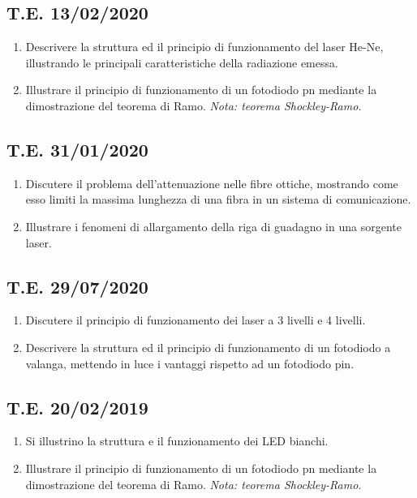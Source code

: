 \documentclass[9pt]{extarticle}
\begin{document}
\subsection{T.E. 13/02/2020}
\begin{enumerate}
  \item Descrivere la struttura ed il principio di funzionamento del laser He-Ne, illustrando le principali caratteristiche della radiazione emessa.
  \item Illustrare il principio di funzionamento di un fotodiodo pn mediante la dimostrazione del teorema di Ramo. \textit{Nota: teorema Shockley-Ramo.}
\end{enumerate}

\subsection{T.E. 31/01/2020}
\begin{enumerate}
  \item Discutere il problema dell'attenuazione nelle fibre ottiche, mostrando come esso limiti la massima lunghezza di
        una fibra in un sistema di comunicazione.
  \item Illustrare i fenomeni di allargamento della riga di guadagno in una sorgente laser.
\end{enumerate}

\subsection{T.E. 29/07/2020}
\begin{enumerate}
  \item Discutere il principio di funzionamento dei laser a 3 livelli e 4 livelli.
  \item Descrivere la struttura ed il principio di funzionamento di un fotodiodo a valanga, mettendo in luce i vantaggi
        rispetto ad un fotodiodo pin.
\end{enumerate}

\subsection{T.E. 20/02/2019}
\begin{enumerate}
  \item Si illustrino la struttura e il funzionamento dei LED bianchi.
  \item Illustrare il principio di funzionamento di un fotodiodo pn mediante la dimostrazione del teorema di Ramo. \textit{Nota: teorema Shockley-Ramo.}
\end{enumerate}
\end{document}
